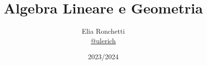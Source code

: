\documentclass[12pt, a4paper, openany]{book}
\begin{document}
\title{Algebra Lineare e Geometria}

\author{
	Elia Ronchetti\\
	\small{\href{https://t.me/ulerich}{@ulerich}}
}

\date{2023/2024}

\maketitle

\tableofcontents


\end{document}
